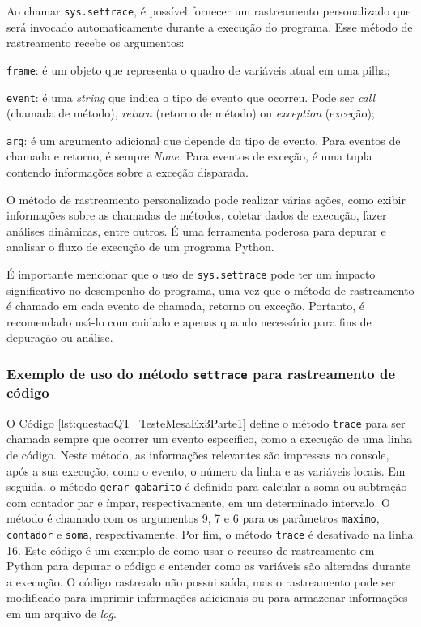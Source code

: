 Ao chamar \verb|sys.settrace|, é possível fornecer um rastreamento personalizado que será invocado automaticamente durante a execução do programa. Esse método de rastreamento recebe os argumentos:

\begin{description}
    \item \verb|frame|: é um objeto que representa o quadro de variáveis atual em uma pilha;
    \item \verb|event|: é uma \textit{string} que indica o tipo de evento que ocorreu. Pode ser \textit{call} (chamada de método), \textit{return} (retorno de método) ou \textit{exception} (exceção);
    \item \verb|arg|: é um argumento adicional que depende do tipo de evento. Para eventos de chamada e retorno, é sempre \textit{None}. Para eventos de exceção, é uma tupla contendo informações sobre a exceção disparada.
\end{description}

O método de rastreamento personalizado pode realizar várias ações, como exibir informações sobre as chamadas de métodos, coletar dados de execução, fazer análises dinâmicas, entre outros. É uma ferramenta poderosa para depurar e analisar o fluxo de execução de um programa Python.

É importante mencionar que o uso de \verb|sys.settrace| pode ter um impacto significativo no desempenho do programa, uma vez que o método de rastreamento é chamado em cada evento de chamada, retorno ou exceção. Portanto, é recomendado usá-lo com cuidado e apenas quando necessário para fins de depuração ou análise.

\subsubsection{Exemplo de uso do método \texttt{settrace} para rastreamento de código}

O Código \ref{lst:questaoQT_TesteMesaEx3Parte1} define o método \verb|trace| para ser chamada sempre que ocorrer um evento específico, como a execução de uma linha de código. Neste método, as informações relevantes são impressas no console, após a sua execução, como o evento, o número da linha e as variáveis locais.
%
Em seguida, o método \verb|gerar_gabarito| é definido para calcular a soma ou subtração com contador par e ímpar, respectivamente, em um determinado intervalo. O método é chamado com os argumentos 9, 7 e 6 para os parâmetros \verb|maximo|, \verb|contador| e \verb|soma|, respectivamente.
%
Por fim, o método \verb|trace| é desativado na linha 16.
%
Este código é um exemplo de como usar o recurso de rastreamento em Python para depurar o código e entender como as variáveis são alteradas durante a execução. O código rastreado não possui saída, mas o rastreamento pode ser modificado para imprimir informações adicionais ou para armazenar informações em um arquivo de \textit{log}.

